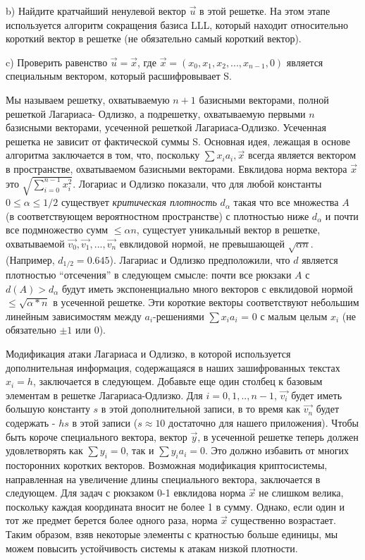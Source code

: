 \documentclass[a4paper,12pt]{article}
\begin{document}
\indent b) Найдите кратчайший ненулевой вектор $\Vec{u}$ в этой решетке. На этом этапе используется алгоритм сокращения базиса LLL, который находит относительно короткий вектор в решетке (не обязательно самый короткий вектор). \newline

\indent c) Проверить равенство $\Vec{u} = \Vec{x}$, где $\Vec{x} = (x_0,x_1,x_2,..., x_{n-1}, 0)$ является специальным вектором, который расшифровывает S.\newline

\indent
Мы называем решетку, охватываемую $n +1$ базисными векторами, полной решеткой Лагариаса- Одлизко, а подрешетку, охватываемую первыми $n$ базисными векторами, усеченной решеткой Лагариаса-Одлизко. Усеченная решетка не зависит от фактической суммы S.
Основная идея, лежащая в основе алгоритма заключается в том, что, поскольку $\sum x_i a_i, \Vec{x}$ всегда является вектором в пространстве, охватываемом базисными векторами. Евклидова норма вектора $\Vec{x}$ это $\sqrt{\sum_{i=0}^{n-1} x_{i}^2}$. Логариас и Одлизко показали, что для любой константы $0 \leq \alpha \leq 1/2$ существует \textsl{критическая плотность} $d_{\alpha}$ такая что все множества $A$ (в соответствующем вероятностном пространстве) с плотностью ниже $d_{\alpha}$ и почти все подмножество сумм $\leq \alpha n$, сущестует уникальный вектор в решетке, охватываемой $\Vec{v_0}, \Vec{v_1}, ... ,\Vec{v_n}$ евклидовой нормой, не превышающей $\sqrt{\alpha n}$. (Например, $d_{1/2} = 0.645$). Лагариас и Одлизко предположили, что $d$ является плотностью “отсечения” в следующем смысле: почти все рюкзаки $A$ с $d(A) > d_{\alpha}$ будут иметь экспоненциально много векторов с евклидовой нормой $\leq \sqrt{\alpha *n}$ в усеченной решетке. Эти короткие векторы соответствуют небольшим линейным зависимостям между $a_i$-решениями $\sum x_i a_i$ = 0 с малым целым $x_i$ (не обязательно $\pm 1$ или 0). \newline

\indent Модификация атаки Лагариаса и Одлизко, в которой используется дополнительная информация, содержащаяся в наших зашифрованных текстах $ x_i= h$, заключается в следующем. Добавьте еще один столбец к базовым элементам в решетке Лагариаса-Одлизко. Для $i = 0, 1, .., n - 1$, $\Vec{v_i}$ будет иметь большую константу $s$ в этой дополнительной записи, в то время как $\Vec{v_n}$ будет содержать - $hs$ в этой записи ($s \approx 10$ достаточно для нашего приложения). Чтобы быть короче специального вектора, вектор $\Vec{y}$, в усеченной решетке теперь должен удовлетворять как $\sum y_i = 0$, так и $\sum y_i a_i = 0$. Это должно избавить от многих посторонних коротких векторов. \newline
\indent 
Возможная модификация криптосистемы, направленная на увеличение длины специального вектора, заключается в следующем. Для задач с рюкзаком 0-1 евклидова норма $\Vec{x}$ не слишком велика, поскольку каждая координата вносит не более 1 в сумму. Однако, если один и тот же предмет берется более одного раза, норма  $\Vec{x}$ существенно возрастает. Таким образом, взяв некоторые элементы с кратностью больше единицы, мы можем повысить устойчивость системы к атакам низкой плотности. 
\end{document}

